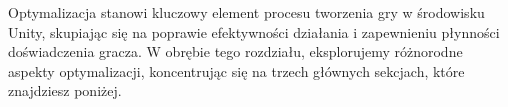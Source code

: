 Optymalizacja stanowi kluczowy element procesu tworzenia gry w środowisku Unity, skupiając się na poprawie efektywności działania i zapewnieniu płynności doświadczenia gracza. W obrębie tego rozdziału, eksplorujemy różnorodne aspekty optymalizacji, koncentrując się na trzech głównych sekcjach, które znajdziesz poniżej.